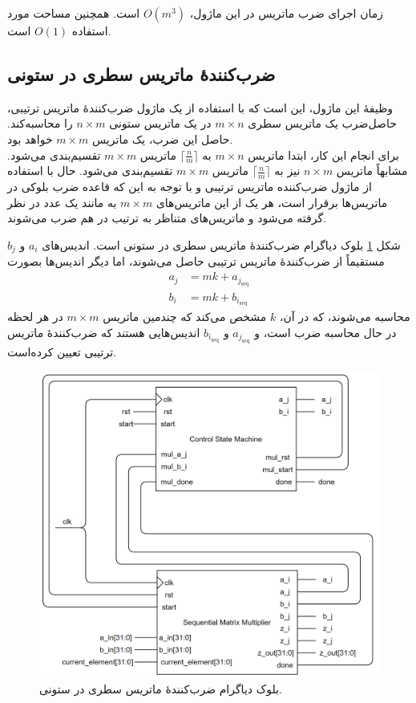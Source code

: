 \documentclass[conference]{IEEEtran-ModifiedForMVIP}
\begin{document}
زمان اجرای ضرب ماتریس در این ماژول،
$O(m^3)$
است. همچنین مساحت مورد استفاده
$O(1)$
است.

\subsection{
    ضرب‌کنندهٔ ماتریس سطری در ستونی
}

وظیفهٔ این ماژول، این است که با استفاده از یک ماژول ضرب‌کنندهٔ ماتریس ترتیبی، حاصل‌ضرب یک ماتریس سطری
$m \times n$
در یک ماتریس ستونی
$n \times m$
را محاسبه‌کند.
حاصل این ضرب، یک ماتریس
$m \times m$
خواهد بود.
\\
برای انجام این‌ کار، ابتدا ماتریس 
$m \times n$
به 
${\lceil\frac{n}{m}\rceil}$
ماتریس 
$m \times m$
تقسیم‌بندی می‌شود.
مشابهاً ماتریس 
$n \times m$
نیز به 
$\lceil\frac{n}{m}\rceil$
ماتریس 
$m \times m$
تقسیم‌بندی می‌شود.
حال با استفاده از ماژول ضرب‌کننده ماتریس ترتیبی و با توجه به این که قاعده ضرب بلوکی در ماتریس‌ها برقرار است، هر یک از این ماتریس‌های 
$m \times m$
به مانند یک عدد در نظر گرفته می‌شود و ماتریس‌های متناظر به ترتیب در هم ضرب می‌شوند.

شکل
\ref{fig:RowColBD}
بلوک دیاگرام ضرب‌کنندهٔ ماتریس سطری در ستونی است.
اندیس‌های
$a_i$
و
$b_j$
مستقیماً از ضرب‌کنندهٔ ماتریس ترتیبی حاصل می‌شوند، اما دیگر اندیس‌ها بصورت
\begin{align*}
    a_j &= mk + a_{j_{\text{seq}}}\\
    b_i &= mk + b_{i_{\text{seq}}}
\end{align*}
محاسبه می‌شوند، که در آن،
$k$
مشخص می‌کند که چندمین ماتریس
$m \times m$
در هر لحظه در حال محاسبه ضرب است، و
$a_{j_{\text{seq}}}$
و
$b_{i_{\text{seq}}}$
اندیس‌هایی هستند که ضرب‌کنندهٔ ماتریس ترتیبی تعیین کرده‌است.

\begin{figure}[t]
\centering 
\includegraphics[width=1\linewidth]{Images/RowColBD.png}
\caption{
\centering
بلوک دیاگرام ضرب‌کنندهٔ ماتریس سطری در ستونی.
}\label{fig:RowColBD}
\end{figure}
\end{document}
